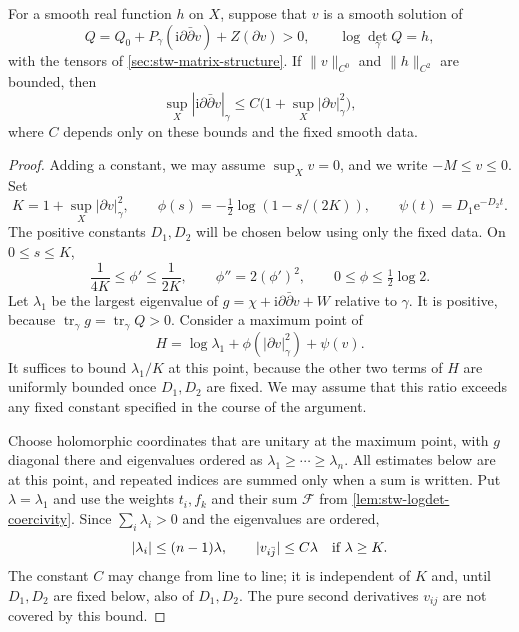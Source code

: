 \begin{theorem}\label{thm:stw-second-order-reconstructed}
For a smooth real function $h$ on $X$, suppose that $v$ is a smooth solution of
\[
 Q=Q_0+P_\gamma(\mathrm i\partial\bar\partial v)+Z(\partial v)>0,
 \qquad \log\det_\gamma Q=h,
\]
with the tensors of \cref{sec:stw-matrix-structure}. If $\|v\|_{C^0}$ and $\|h\|_{C^2}$ are bounded, then
\[
 \sup_X|\mathrm i\partial\bar\partial v|_\gamma
       \leq C\bigl(1+\sup_X|\partial v|_\gamma^2\bigr),
\]
where $C$ depends only on these bounds and the fixed smooth data.
\end{theorem}
\begin{proof}
Adding a constant, we may assume $\sup_Xv=0$, and we write $-M\leq v\leq0$. Set
\[
 K=1+\sup_X|\partial v|_\gamma^2,\qquad
 \phi(s)=-\tfrac12\log(1-s/(2K)),\qquad
 \psi(t)=D_1\mathrm{e}^{-D_2t}.
\]
The positive constants $D_1,D_2$ will be chosen below using only the fixed data. On $0\leq s\leq K$,
\[
 \frac1{4K}\leq\phi'\leq\frac1{2K},\qquad
 \phi''=2(\phi')^2,\qquad 0\leq\phi\leq\tfrac12\log2.
\]
Let $\lambda_1$ be the largest eigenvalue of $g=\chi+\mathrm i\partial\bar\partial v+W$ relative to $\gamma$. It is positive, because $\operatorname{tr}_\gamma g=\operatorname{tr}_\gamma Q>0$. Consider a maximum point of
\[
 H=\log\lambda_1+\phi(|\partial v|_\gamma^2)+\psi(v).
\]
It suffices to bound $\lambda_1/K$ at this point, because the other two terms of $H$ are uniformly bounded once $D_1,D_2$ are fixed. We may assume that this ratio exceeds any fixed constant specified in the course of the argument.

Choose holomorphic coordinates that are unitary at the maximum point, with $g$ diagonal there and eigenvalues ordered as $\lambda_1\geq\cdots\geq\lambda_n$. All estimates below are at this point, and repeated indices are summed only when a sum is written. Put $\lambda=\lambda_1$ and use the weights $t_i,f_k$ and their sum $\mathcal F$ from \cref{lem:stw-logdet-coercivity}. Since $\sum_i\lambda_i>0$ and the eigenvalues are ordered,
\[
 |\lambda_i|\leq(n-1)\lambda,\qquad
 |v_{i\bar j}|\leq C\lambda
       \quad\hbox{if }\lambda\geq K.
\]
The constant $C$ may change from line to line; it is independent of $K$ and, until $D_1,D_2$ are fixed below, also of $D_1,D_2$. The pure second derivatives $v_{ij}$ are not covered by this bound.


\end{proof}
